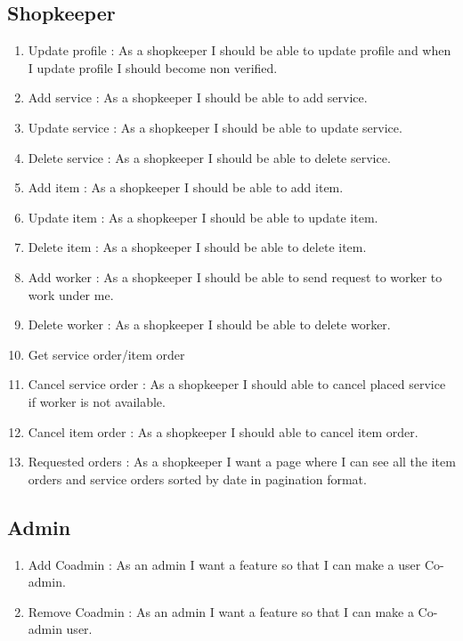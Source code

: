 \documentclass[conference]{IEEEtran}
\begin{document}
\subsection{Shopkeeper}
\begin{enumerate}
    \item Update profile : As a shopkeeper I should be able to update profile and when I update profile I should become non verified.
    \item Add service : As a shopkeeper I should be able to add service.
    \item Update service : As a shopkeeper I should be able to update service.
    \item Delete service : As a shopkeeper I should be able to delete service.
    \item Add item : As a shopkeeper I should be able to add item.
    \item Update item : As a shopkeeper I should be able to update item.
    \item Delete item : As a shopkeeper I should be able to delete item.
    \item Add worker : As a shopkeeper I should be able to send request to worker to work under me.
    \item Delete worker : As a shopkeeper I should be able to delete worker.
    \item Get service order/item order
    \item Cancel service order : As a shopkeeper I should able to cancel placed service if worker is not available.
    \item Cancel item order : As a shopkeeper I should able to cancel item order.
    \item Requested orders : As a shopkeeper I want a page where I can see all the item orders and service orders sorted by date in pagination format.
\end{enumerate}

\subsection{Admin}
\begin{enumerate}
    \item Add Coadmin : As an admin I want a feature so that I can make a user Co-admin.
    \item Remove Coadmin : As an admin I want a feature so that I can make a Co-admin user.
\end{enumerate}
    
\end{document}

